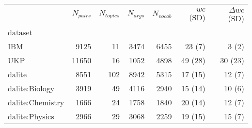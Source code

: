 \begin{tabular}{lrrrrrr}
\toprule
{} &  $N_{pairs}$ &  $N_{topics}$ &  $N_{args}$  &  $N_{vocab}$ & 
$\overline{wc}$ (SD) & 
$\overline{\Delta wc}$ (SD) \\
dataset          &          &           &         &        &              &                   \\
\midrule
IBM              &     9125 &        11 &    3474 &   6455 &       23 (7) &             3 (2) \\
UKP              &    11650 &        16 &    1052 &   4898 &      49 (28) &           30 (23) \\
dalite           &     8551 &       102 &    8942 &   5315 &      17 (15) &            12 (7) \\
dalite:Biology   &     3919 &        49 &    4116 &   2940 &      15 (14) &            10 (6) \\
dalite:Chemistry &     1666 &        24 &    1758 &   1840 &      20 (14) &            12 (7) \\
dalite:Physics   &     2966 &        29 &    3068 &   2259 &      19 (15) &            15 (7) \\
\bottomrule
\end{tabular}
